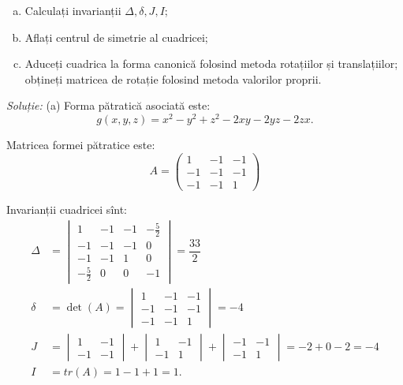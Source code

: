\documentclass[11pt,a4paper]{article}
\theoremstyle{dotless}
\theoremstyle{dotlessdr}
\begin{document}
\begin{enumerate}[(a)]
	\item Calculați invarianții $\Delta, \delta, J, I$;
	\item Aflați centrul de simetrie al cuadricei;
	\item Aduceți cuadrica la forma canonică folosind metoda rotațiilor și
translațiilor; obțineți matricea de rotație folosind metoda valorilor proprii.
\end{enumerate}

\emph{Soluție:}
(a)	Forma pătratică asociată este: 
 \[
	g(x, y, z) = x^2 - y^2 + z^2 - 2xy - 2yz - 2zx.
\]

Matricea formei pătratice este: 
 \[
	A = \begin{pmatrix}
	        1 & -1 & -1 \\
	        -1 & -1 & -1 \\
	        -1 & -1 & 1
        \end{pmatrix}
\]

Invarianții cuadricei sînt:
\begin{align*}
	\Delta &= \begin{vmatrix}
	             1 & -1 & -1 & -\frac{5}{2} \\
	             -1 & -1 & -1 & 0 \\
	             -1 & -1 & 1 & 0 \\
	             - \frac{5}{2} & 0 & 0 & -1
             \end{vmatrix} = \dfrac{33}{2} \\
    \delta &= \det(A) = \begin{vmatrix}
	                        1 & -1 & -1 \\
	                        -1 & -1 & -1 \\
	                        -1 & -1 & 1
                        \end{vmatrix} = -4 \\
    J &= \begin{vmatrix}
	         1 & -1 \\
	         -1 & -1
         \end{vmatrix} +
         \begin{vmatrix}
	         1 & -1 \\
	         -1 & 1
         \end{vmatrix} +
         \begin{vmatrix}
	         -1 & -1 \\
	         -1 & 1
         \end{vmatrix} = 
         -2 + 0 - 2 = -4 \\
    I &= tr(A) = 1 - 1 + 1 = 1.
\end{align*}
\end{document}
